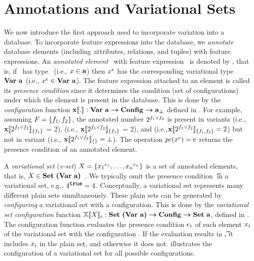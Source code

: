 \section{Annotations and Variational Sets}
\label{sec:vset}


We now introduce the first approach used to incorporate variation into a database.
To incorporate feature expressions into the database,
we \emph{annotate} database elements (including attributes, relations, and tuples) 
with feature expressions. An \emph{annotated element} \elem\ with feature expression \dimMeta\
is denoted by \annot \elem, 
that is, if \elem\ has type \typevar\ (i.e., $\elem \in \typevar$)
then $\annot \elem$ has the corresponding variational type 
$\vartype \typevar$ (i.e., $\annot \elem \in \vartype \typevar$).
%
The feature expression attached to an element is called its \emph{presence
condition} since it determines the condition (set of configurations) under
which the element is present in the database. 
This is done by the \emph{configuration} function $\xeSem [] . : \elemSet \totype \confSet \totype \maybe {\pelemSet}$ defined in .
For example, assuming
$\features=\set{\A,\B}$, the annotated number $\annot [\A \vee \B] 2$ is present
in variants \setDef{\A} (i.e., $\xeSem [\setDef{\A}] {\annot [\A \vee \B] 2}$ = 2), 
\setDef{\B} (i.e., $\xeSem [\setDef{\A}] {\annot [\A \vee \B] 2}$ = 2), 
and \setDef{\A,\B} (i.e.,$\xeSem [\setDef{\A, \B}] {\annot [\A \vee \B] 2} = 2$) 
but not in variant
\setDef{} (i.e., $\xeSem [\setDef { }] {\annot [\A \vee \B] 2} = \bot$). 
%
The operation $\getPC{\annot{\elem}}=e$ returns the presence condition of an
annotated element.



A \emph{variational set} (\emph{v-set}) $\vset = \setDef {\annot [\dimMeta_1] {\elem_1},\ldots, \annot [\dimMeta_n] {\elem_n}}$ 
is a set of annotated elements, 
that is,
$\vset \in \vsetSet$~\cite{EWC13fosd,Walk14onward,ATW17dbpl}.
We typically omit the presence condition \t\ in a variational set,
e.g., $\annot [\t] 4 = 4$.
%
Conceptually, a variational set represents many different plain sets simultaneously.
These plain sets can be generated by \emph{configuring} a variational set with a configuration.
This is done by the \emph{variational set configuration} function
\ensuremath{\osetSem \vset: \vsetSet \totype \confSet \totype \psetSet}, defined in .
The configuration function evaluates the presence condition $\dimMeta_i$ of each 
element $\elem_i$ of the variational set with the configuration \config. 
If the evaluation results in \t, it includes $\elem_i$ in the plain set, and otherwise it
does not. \exref{vset-conf} illustrates the configuration of a variational set for all
possible configurations. 

